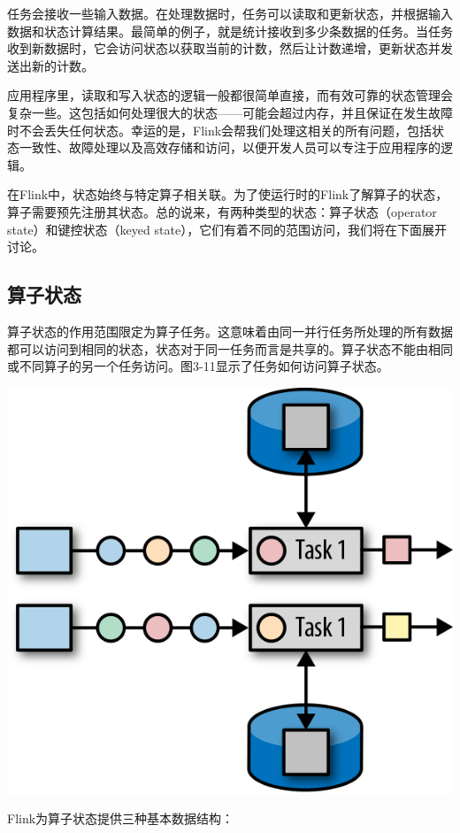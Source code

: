 \documentclass[oneside]{ctexbook}
\begin{document}
任务会接收一些输入数据。在处理数据时，任务可以读取和更新状态，并根据输入数据和状态计算结果。最简单的例子，就是统计接收到多少条数据的任务。当任务收到新数据时，它会访问状态以获取当前的计数，然后让计数递增，更新状态并发送出新的计数。

应用程序里，读取和写入状态的逻辑一般都很简单直接，而有效可靠的状态管理会复杂一些。这包括如何处理很大的状态——可能会超过内存，并且保证在发生故障时不会丢失任何状态。幸运的是，Flink会帮我们处理这相关的所有问题，包括状态一致性、故障处理以及高效存储和访问，以便开发人员可以专注于应用程序的逻辑。

在Flink中，状态始终与特定算子相关联。为了使运行时的Flink了解算子的状态，算子需要预先注册其状态。总的说来，有两种类型的状态：算子状态（operator state）和键控状态（keyed state），它们有着不同的范围访问，我们将在下面展开讨论。

\subsection{算子状态}

算子状态的作用范围限定为算子任务。这意味着由同一并行任务所处理的所有数据都可以访问到相同的状态，状态对于同一任务而言是共享的。算子状态不能由相同或不同算子的另一个任务访问。图3-11显示了任务如何访问算子状态。

\noindent \includegraphics[width=\textwidth]{spaf_0311.png}

Flink为算子状态提供三种基本数据结构：
\end{document}
